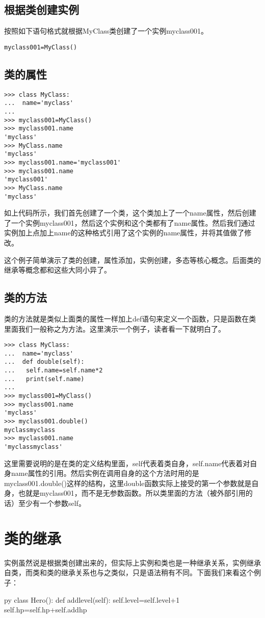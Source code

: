 \documentclass[12pt,oneside]{book}
\begin{document}
\begin{common-format}
\subsection{根据类创建实例}
按照如下语句格式就根据MyClass类创建了一个实例myclass001。
\begin{Verbatim}
myclass001=MyClass()
\end{Verbatim}

\subsection{类的属性}
\begin{Verbatim}
>>> class MyClass:
...  name='myclass'
... 
>>> myclass001=MyClass()
>>> myclass001.name
'myclass'
>>> MyClass.name
'myclass'
>>> myclass001.name='myclass001'
>>> myclass001.name
'myclass001'
>>> MyClass.name
'myclass'
\end{Verbatim}
如上代码所示，我们首先创建了一个类，这个类加上了一个name属性，然后创建了一个实例myclass001，然后这个实例和这个类都有了name属性。然后我们通过实例加上点加上name的这种格式引用了这个实例的name属性，并将其值做了修改。

这个例子简单演示了类的创建，属性添加，实例创建，多态等核心概念。后面类的继承等概念都和这些大同小异了。


\subsection{类的方法}
类的方法就是类似上面类的属性一样加上def语句来定义一个函数，只是函数在类里面我们一般称之为方法。这里演示一个例子，读者看一下就明白了。
\begin{Verbatim}
>>> class MyClass:
...  name='myclass'
...  def double(self):
...   self.name=self.name*2
...   print(self.name)
... 
>>> myclass001=MyClass()
>>> myclass001.name
'myclass'
>>> myclass001.double()
myclassmyclass
>>> myclass001.name
'myclassmyclass'
\end{Verbatim}

这里需要说明的是在类的定义结构里面，self代表着类自身，self.name代表着对自身name属性的引用。然后实例在调用自身的这个方法时用的是myclass001.double()这样的结构，这里double函数实际上接受的第一个参数就是自身，也就是myclass001，而不是无参数函数。所以类里面的方法（被外部引用的话）至少有一个参数self。





\section{类的继承}
实例虽然说是根据类创建出来的，但实际上实例和类也是一种继承关系，实例继承自类，而类和类的继承关系也与之类似，只是语法稍有不同。下面我们来看这个例子：
\begin{xverbatim}[129]{py}
class Hero():
    def addlevel(self):
        self.level=self.level+1
        self.hp=self.hp+self.addhp


\end{xverbatim}
\end{common-format}
\end{document}
